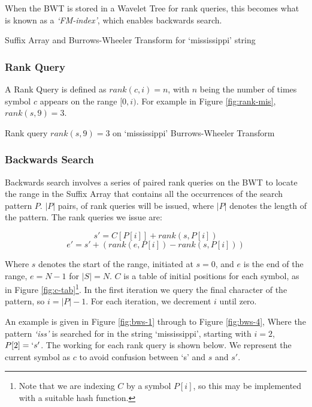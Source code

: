 When the BWT is stored in a Wavelet Tree for rank queries, this becomes what is known as a \emph{`FM-index'}, which enables backwards search.


			{Suffix Array and Burrows-Wheeler Transform for
			`mississippi' string}


\subsubsection{Rank Query} %
A Rank Query is defined as $rank(c, i) = n $, with $n$ being the number of
times symbol $c$ appears on the range $[0, i)$. For example in Figure
\ref{fig:rank-mis}, $rank(s, 9) = 3$.

			{Rank query $rank(s, 9) = 3$ on `mississippi' Burrows-Wheeler 
			Transform}

\subsubsection{Backwards Search} %
Backwards search involves a series of paired rank queries on the BWT to locate 
the range in the Suffix Array that contains all the occurrences of the search
pattern $P$. $|P|$ pairs, of rank queries will be issued, where $|P|$ denotes the length of the pattern. The rank queries we issue are:

					$$ s' = C[P[i]] + rank(s, P[i])$$
					$$ e' = s' + (rank(e, P[i]) - rank(s, P[i]))$$

Where $s$ denotes the start of the range, initiated at $s = 0$, and $e$ is the end of the range, $e = N - 1$ for $|S| = N$. $C$ is a table of initial positions for each symbol, as in Figure \ref{fig:c-tab}\footnote{Note that we are indexing $C$ by a symbol $P[i]$, so this may be implemented with a suitable hash function.}. In the first iteration we query the final character of the pattern, so $i = |P| - 1$.  For each iteration, we decrement $i$ until zero.

An example is given in Figure \ref{fig:bws-1} through to Figure \ref{fig:bws-4},
Where the pattern \emph{`iss'} is searched for in the string `mississippi',
starting with $i = 2$, $P[2] = `s'$. The working for each rank query is shown below. We represent the current symbol as $c$ to avoid confusion between `s' and $s$ and $s'$.

